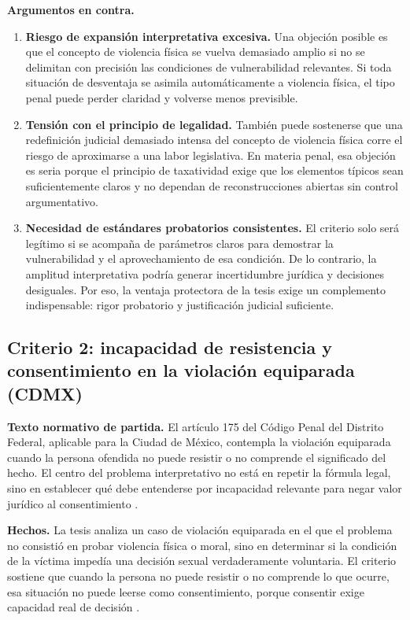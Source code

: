 \documentclass[
	spanish,
	letterpaper, oneside
]{article}
\begin{document}
\textbf{Argumentos en contra.}
\begin{enumerate}
	\item \textbf{Riesgo de expansión interpretativa excesiva.} Una objeción posible es que el concepto de violencia física se vuelva demasiado amplio si no se delimitan con precisión las condiciones de vulnerabilidad relevantes. Si toda situación de desventaja se asimila automáticamente a violencia física, el tipo penal puede perder claridad y volverse menos previsible.
	\item \textbf{Tensión con el principio de legalidad.} También puede sostenerse que una redefinición judicial demasiado intensa del concepto de violencia física corre el riesgo de aproximarse a una labor legislativa. En materia penal, esa objeción es seria porque el principio de taxatividad exige que los elementos típicos sean suficientemente claros y no dependan de reconstrucciones abiertas sin control argumentativo.
	\item \textbf{Necesidad de estándares probatorios consistentes.} El criterio solo será legítimo si se acompaña de parámetros claros para demostrar la vulnerabilidad y el aprovechamiento de esa condición. De lo contrario, la amplitud interpretativa podría generar incertidumbre jurídica y decisiones desiguales. Por eso, la ventaja protectora de la tesis exige un complemento indispensable: rigor probatorio y justificación judicial suficiente.
\end{enumerate}

\subsection{Criterio 2: incapacidad de resistencia y consentimiento en la violación equiparada (CDMX)}

\textbf{Texto normativo de partida.} El artículo 175 del Código Penal del Distrito Federal, aplicable para la Ciudad de México, contempla la violación equiparada cuando la persona ofendida no puede resistir o no comprende el significado del hecho. El centro del problema interpretativo no está en repetir la fórmula legal, sino en establecer qué debe entenderse por incapacidad relevante para negar valor jurídico al consentimiento \citep{scjnIncapacidadResistencia2019}.

\textbf{Hechos.} La tesis analiza un caso de violación equiparada en el que el problema no consistió en probar violencia física o moral, sino en determinar si la condición de la víctima impedía una decisión sexual verdaderamente voluntaria. El criterio sostiene que cuando la persona no puede resistir o no comprende lo que ocurre, esa situación no puede leerse como consentimiento, porque consentir exige capacidad real de decisión \citep{scjnIncapacidadResistencia2019}.
\end{document}

